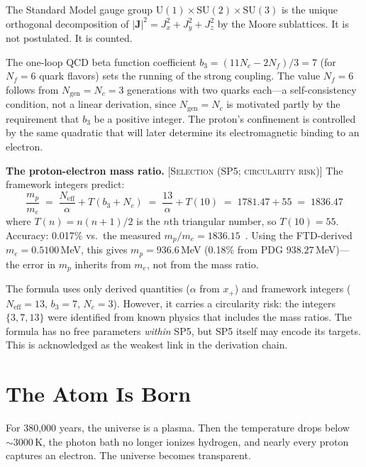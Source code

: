 \documentclass[12pt]{article}
\newcommand{\etag}[1]{{\normalfont\textsc{\footnotesize [#1]}}}
\theoremstyle{compact}
\begin{document}
The Standard Model gauge group $\mathrm{U}(1) \times \mathrm{SU}(2) \times \mathrm{SU}(3)$ is the unique orthogonal decomposition of $|\mathbf{J}|^2 = J_x^2 + J_y^2 + J_z^2$ by the Moore sublattices. It is not postulated. It is counted.

The one-loop QCD beta function coefficient $b_3 = (11N_c - 2N_f)/3 = 7$ (for $N_f = 6$ quark flavors) sets the running of the strong coupling. The value $N_f = 6$ follows from $N_{\mathrm{gen}} = N_c = 3$ generations with two quarks each---a self-consistency condition, not a linear derivation, since $N_{\mathrm{gen}} = N_c$ is motivated partly by the requirement that $b_3$ be a positive integer. The proton's confinement is controlled by the same quadratic that will later determine its electromagnetic binding to an electron.

\smallskip
\noindent\textbf{The proton-electron mass ratio.} \etag{Selection (SP5; circularity risk)} The framework integers predict:
\[
\frac{m_p}{m_e} \;=\; \frac{N_{\mathrm{eff}}}{\alpha} + T(b_3 + N_c) \;=\; \frac{13}{\alpha} + T(10) \;=\; 1781.47 + 55 \;=\; 1836.47
\]
where $T(n) = n(n+1)/2$ is the $n$th triangular number, so $T(10) = 55$. Accuracy: 0.017\% vs.\ the measured $m_p/m_e = 1836.15$~\cite{codata}. Using the FTD-derived $m_e = 0.5100$\,MeV, this gives $m_p = 936.6$\,MeV (0.18\% from PDG $938.27$\,MeV)---the error in $m_p$ inherits from $m_e$, not from the mass ratio.

The formula uses only derived quantities ($\alpha$ from $x_+$) and framework integers ($N_{\mathrm{eff}} = 13$, $b_3 = 7$, $N_c = 3$). However, it carries a circularity risk: the integers $\{3, 7, 13\}$ were identified from known physics that includes the mass ratios. The formula has no free parameters \emph{within} SP5, but SP5 itself may encode its targets. This is acknowledged as the weakest link in the derivation chain.


\section{The Atom Is Born}
\label{sec:atom}

For 380,000 years, the universe is a plasma. Then the temperature drops below $\sim 3000$\,K, the photon bath no longer ionizes hydrogen, and nearly every proton captures an electron. The universe becomes transparent.
\end{document}
